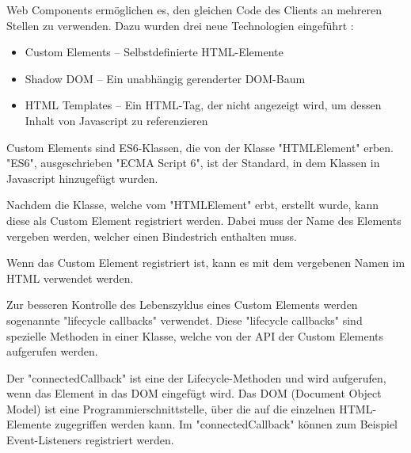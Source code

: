 
Web Components ermöglichen es, den gleichen Code des Clients an mehreren Stellen zu verwenden. 
Dazu wurden drei neue Technologien eingeführt \cite{MDNWebComponents}:

\begin{itemize}
    \item Custom Elements -- Selbstdefinierte HTML-Elemente
    \item Shadow DOM -- Ein unabhängig gerenderter DOM-Baum
    \item HTML Templates -- Ein HTML-Tag, der nicht angezeigt wird, um dessen Inhalt von Javascript zu referenzieren
\end{itemize}



Custom Elements sind ES6-Klassen, die von der Klasse "{\ttfamily HTMLElement}" erben. 
"ES6", ausgeschrieben "ECMA Script 6", ist der Standard, in dem Klassen in Javascript hinzugefügt wurden. \cite{MDNes6Classes}


Nachdem die Klasse, welche vom "{\ttfamily HTMLElement}" erbt, erstellt wurde, kann diese als Custom Element registriert werden. 
Dabei muss der Name des Elements vergeben werden, welcher einen Bindestrich enthalten muss.


Wenn das Custom Element registriert ist, kann es mit dem vergebenen Namen im HTML verwendet werden.


Zur besseren Kontrolle des Lebenszyklus eines Custom Elements werden sogenannte "lifecycle callbacks" verwendet.
Diese "lifecycle callbacks" sind spezielle Methoden in einer Klasse, welche von der API der Custom Elements aufgerufen werden. \cite{MDNWebCustomElements}


Der "{\ttfamily connectedCallback}" ist eine der Lifecycle-Methoden und wird aufgerufen, wenn das Element in das DOM eingefügt wird. 
Das DOM (Document Object Model) ist eine Programmierschnittstelle, über die auf die einzelnen HTML-Elemente zugegriffen werden kann. \cite{MDNDOM} Im "{\ttfamily connectedCallback}" können zum Beispiel Event-Listeners registriert werden. \cite{MDNWebCustomElements}

